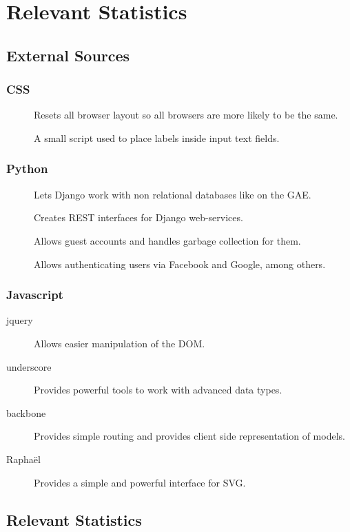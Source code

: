\section{Relevant Statistics}
\subsection{External Sources}
\subsubsection{CSS}
\begin{description}
	\item[] Resets all browser layout so all browsers are more likely to be the same.
	\item[] A small script used to place labels inside input text fields.
\end{description}
	
\subsubsection{Python}
\begin{description}
	\item[] Lets Django work with non relational databases like on the GAE.
	\item[] Creates REST interfaces for Django web-services.
	\item[] Allows guest accounts and handles garbage collection for them.
	\item[] Allows authenticating users via Facebook and Google, among others.
\end{description}

\subsubsection{Javascript}
\begin{description}
	\item[jquery] Allows easier manipulation of the DOM.
	\item[underscore] Provides powerful tools to work with advanced data types.
	\item[backbone] Provides simple routing and provides client side representation of models.
	\item[Rapha\"{e}l] Provides a simple and powerful interface for SVG.
\end{description}

\subsection{Relevant Statistics}
